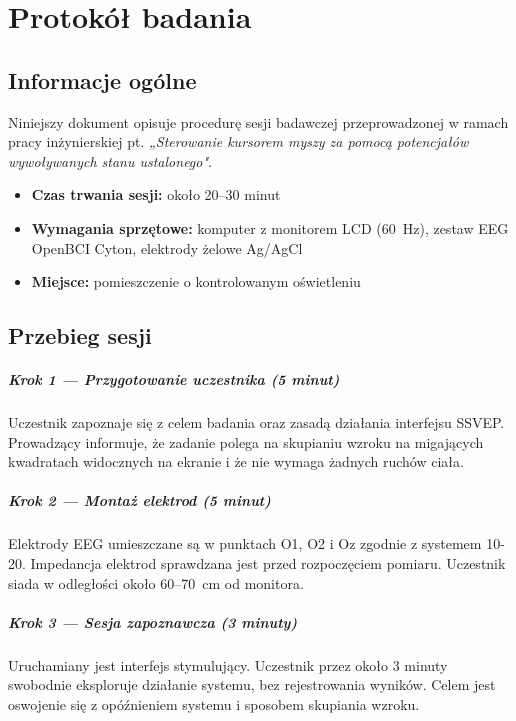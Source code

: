 \chapter{Protokół badania}
\label{appendix:protokol}

\section*{Informacje ogólne}

Niniejszy dokument opisuje procedurę sesji badawczej przeprowadzonej 
w ramach pracy inżynierskiej pt. \textit{„Sterowanie kursorem myszy 
za pomocą potencjałów wywoływanych stanu ustalonego"}.

\begin{itemize}
    \item \textbf{Czas trwania sesji:} około 20--30 minut
    \item \textbf{Wymagania sprzętowe:} komputer z monitorem LCD 
    (60~Hz), zestaw EEG OpenBCI Cyton, elektrody żelowe Ag/AgCl
    \item \textbf{Miejsce:} pomieszczenie o kontrolowanym oświetleniu
\end{itemize}

\section*{Przebieg sesji}

\paragraph{Krok 1 — Przygotowanie uczestnika (5 minut)}
Uczestnik zapoznaje się z celem badania oraz zasadą działania 
interfejsu SSVEP. Prowadzący informuje, że zadanie polega na 
skupianiu wzroku na migających kwadratach widocznych na ekranie 
i że nie wymaga żadnych ruchów ciała.

\paragraph{Krok 2 — Montaż elektrod (5 minut)}
Elektrody EEG umieszczane są w punktach O1, O2 i Oz zgodnie 
z systemem 10-20. Impedancja elektrod sprawdzana jest przed 
rozpoczęciem pomiaru. Uczestnik siada w odległości około 
60--70~cm od monitora.

\paragraph{Krok 3 — Sesja zapoznawcza (3 minuty)}
Uruchamiany jest interfejs stymulujący. Uczestnik przez 
około 3 minuty swobodnie eksploruje działanie systemu, 
bez rejestrowania wyników. Celem jest oswojenie się 
z opóźnieniem systemu i sposobem skupiania wzroku.

